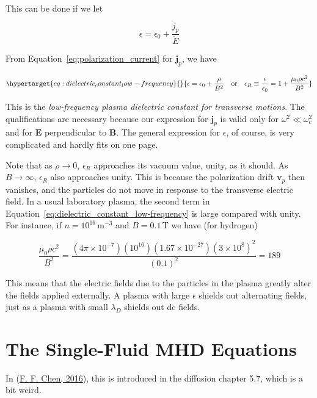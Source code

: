 \documentclass[
  notoc %
]{tufte-book}
\begin{document}
This can be done if we let

\[
\epsilon = \epsilon_0 + \frac{j_p}{\dot{E}}
\]

From Equation~\ref{eq:polarization_current} for \(\mathbf{j}_p\), we
have

\begin{equation}\protect\hypertarget{eq:dielectric_constant_low-frequency}{}{
\epsilon = \epsilon_0 + \frac{\rho}{B^2}\quad \text{or}\quad \epsilon_R\equiv \frac{\epsilon}{\epsilon_0} = 1+\frac{\mu_0\rho c^2}{B^2}
}\label{eq:dielectric_constant_low-frequency}\end{equation}

This is the \emph{low-frequency plasma dielectric constant for
transverse motions}. The qualifications are necessary because our
expression for \(\mathbf{j}_p\) is valid only for
\(\omega^2\ll\omega_c^2\) and for \(\mathbf{E}\) perpendicular to
\(\mathbf{B}\). The general expression for \(\epsilon\), of course, is
very complicated and hardly fits on one page.

Note that as \(\rho\rightarrow 0\), \(\epsilon_R\) approaches its vacuum
value, unity, as it should. As \(B\rightarrow\infty\), \(\epsilon_R\)
also approaches unity. This is because the polarization drift
\(\mathbf{v}_p\) then vanishes, and the particles do not move in
response to the transverse electric field. In a usual laboratory plasma,
the second term in Equation~\ref{eq:dielectric_constant_low-frequency}
is large compared with unity. For instance, if
\(n=10^{16}\,\text{m}^{-3}\) and \(B=0.1\,\text{T}\) we have (for
hydrogen)

\[
\frac{\mu_0\rho c^2}{B^2} = \frac{(4\pi\times 10^{-7})(10^{16})(1.67\times 10^{-27})(3\times 10^8)^2}{(0.1)^2} = 189
\]

This means that the electric fields due to the particles in the plasma
greatly alter the fields applied externally. A plasma with large
\(\epsilon\) shields out alternating fields, just as a plasma with small
\(\lambda_D\) shields out dc fields.

\hypertarget{the-single-fluid-mhd-equations}{%
\section{The Single-Fluid MHD
Equations}\label{the-single-fluid-mhd-equations}}

In (\protect\hyperlink{ref-chen2016introduction}{F. F. Chen, 2016}),
this is introduced in the diffusion chapter 5.7, which is a bit weird.
\end{document}
